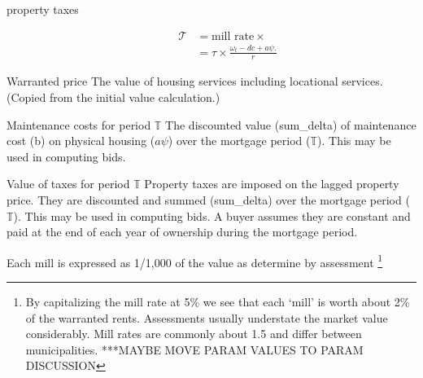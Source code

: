 \begin{description}
\item[property taxes]
\begin{align*}
\mathcal{T} &= \text{mill rate} \times  \\
&= \tau \times \frac{\omega_t- {dc} + a\psi.}{r}
\end{align*}
\end{description}



{Warranted price} The value of housing services including locational services. (Copied from the initial value calculation.)

{Maintenance costs for period $\mathbb{T}$} The discounted value (sum\_delta) of maintenance cost (b) on  physical housing ($a\psi$) over the mortgage period ($\mathbb{T}$). This may be used in computing bids.

{Value of taxes for period $\mathbb{T}$}
Property taxes are imposed on the  lagged property price. They  are discounted and summed (sum\_delta)  over the mortgage period ($\mathbb{T}$). This may be used in computing bids. A buyer assumes they are constant and paid at the end of each year of ownership during the mortgage period.

Each mill is expressed as  1/1,000 of the value as determine by assessment \footnote{By capitalizing the mill rate at 5\%  we see that each `mill' is worth about 2\% of the warranted rents. Assessments usually understate the market value considerably. Mill rates are commonly about 1.5 and differ between municipalities. ***MAYBE MOVE PARAM VALUES TO PARAM DISCUSSION}


